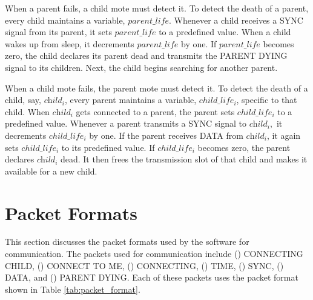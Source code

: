 When a parent fails, a child mote must detect it. To detect the death of a parent, every child maintains a variable, $parent\_life$. Whenever a child receives a SYNC signal from its parent, it sets $parent\_life$ to a predefined value. When a child wakes up from sleep, it decrements $parent\_life$ by one. If $parent\_life$ becomes zero, the child declares its parent dead and transmits the PARENT DYING signal to its children. Next, the child begins searching for another parent.

When a child mote fails, the parent mote must detect it. To detect the death of a child, say, $\textit{child}_{i}$, every parent maintains a variable, $child\_life_{i}$, specific to that child. When $\textit{child}_{i}$ gets connected to a parent, the parent sets $child\_life_{i}$ to a predefined value. Whenever a parent transmits a SYNC signal to $\textit{child}_{i},$ it decrements $child\_life_{i}$ by one. If the parent receives DATA from $\textit{child}_{i}$, it again sets $child\_life_{i}$ to its predefined value. If $child\_life_{i}$ becomes zero, the parent declares $\textit{child}_{i}$ dead. It then frees the transmission slot of that child and makes it available for a new child.



\section{Packet Formats}
This section discusses the packet formats used by the software for communication. The packets used for communication include () CONNECTING CHILD, () CONNECT TO ME, () CONNECTING, () TIME, () SYNC, () DATA, and () PARENT DYING. Each of these packets uses the packet format shown in Table \ref{tab:packet_format}.


